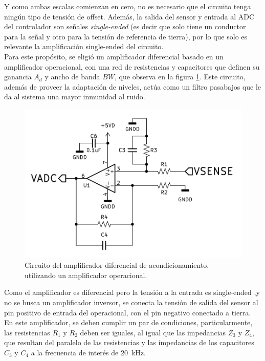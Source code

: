 Y como ambas escalas comienzan en cero, no es necesario que el circuito tenga ningún tipo de tensión de offset. Además, la salida del sensor y entrada al ADC del controlador son señales {\Medium \textit{single-ended}} (es decir que solo tiene un conductor para la señal y otro para la tensión de referencia de tierra), por lo que solo es relevante la amplificación single-ended del circuito.\\

Para este propósito, se eligió un {\Medium amplificador diferencial} basado en un amplificador operacional, con una red de resistencias y capacitores que definen su ganancia $A_d$ y ancho de banda $BW$, que observa en la figura \ref{circuito_acond}. Este circuito, además de proveer la adaptación de niveles, actúa como un filtro pasabajos que le da al sistema una mayor inmunidad al ruido.\\

\begin{figure}[h]
    \centering
    \includegraphics[scale=1.2]{Imagenes/Acondicionamiento.png}
    \caption{Circuito del amplificador diferencial de acondicionamiento, utilizando un amplificador operacional.}
    \label{circuito_acond}
\end{figure}

Como el amplificador es diferencial pero la tensión a la entrada es single-ended ,y no se busca un amplificador inversor, se conecta la tensión de salida del sensor al pin positivo de entrada del operacional, con el pin negativo conectado a tierra. En este amplificador, se deben cumplir un par de condiciones, particularmente, las resistencias $R_1$ y $R_2$ deben ser iguales, al igual que las impedancias $Z_3$ y $Z_4$, que resultan del paralelo de las resistencias y las impedancias de los capacitores $C_3$ y $C_4$ a la frecuencia de interés de \SI[]{20}[]{\kilo\hertz}.\\

